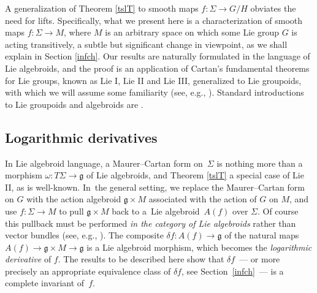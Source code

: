 \documentclass[pdftex]{sigma}%
\numberwithin{equation}{section}
\begin{document}
A generalization of Theorem \ref{tslT} to smooth maps $f \colon \Sigma
\rightarrow G/H$ obviates the need for lifts. Specifically, what we
present here is a characterization of smooth maps $f \colon \Sigma
\rightarrow M$, where $M$ is an arbitrary space on which some Lie
group $G$ is acting transitively, a subtle but significant change in
viewpoint, as we shall explain in Section \ref{infch}. Our results are
naturally formulated in the language of Lie algebroids, and the proof
is an application of Cartan's fundamental theorems for Lie groups,
known as Lie I, Lie II and Lie III, generalized to Lie groupoids, with
which we will assume some familiarity (see, e.g.,
\cite{Crainic_Fernandes_03,Crainic_Fernandes_11}). Standard
introductions to Lie groupoids and algebroids are
\cite{CannasdaSilva_Weinstein_99,Crainic_Fernandes_11,Dufour_Nguyen_05,Mackenzie_05}.


\subsection*{Logarithmic derivatives}

In Lie algebroid language, a Maurer--Cartan form on~$\Sigma $ is
nothing more than a morphism
$\omega \colon {T \Sigma } \rightarrow {\mathfrak g}$ of Lie
algebroids, and Theorem \ref{tslT} a special case of Lie II, as is
well-known. In~the general setting, we replace the Maurer--Cartan form
on $G$ with the action algebroid ${\mathfrak g} \times M$ asso\-ci\-a\-ted
with the action of $G$ on $M$, and use $f \colon \Sigma \rightarrow M$
to pull ${\mathfrak g} \times M$ back to a~Lie algebroid~$A(f)$ over
$\Sigma $. Of course this pullback must be performed {\em in the
 category of Lie algebroids} rather than vector bundles (see, e.g.,
\cite[Section~4.2]{Mackenzie_05}). The composite
$ \delta f \colon A(f) \rightarrow {\mathfrak g}$ of the natural maps
$A(f) \rightarrow {\mathfrak g} \times M \rightarrow {\mathfrak g} $
is a Lie algebroid morphism, which becomes the {\it logarithmic
 derivative} of $f$. The results to be described here show that
$\delta f$~--- or more precisely an appropriate equivalence class of
$\delta f$, see Section~\ref{infch}~--- is a complete invariant of~$f$.
\end{document}
